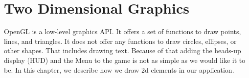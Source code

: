 \section{Two Dimensional Graphics} \label{chap:two_dimensional_graphics}
OpenGL is a low-level graphics API.
It offers a set of functions to draw points, lines, and triangles.
It does not offer any functions to draw circles, ellipses, or other shapes.
That includes drawing text. 
Because of that adding the heads-up display (HUD) and the Menu to the game is not as simple as we would like it to be.
In this chapter, we describe how we draw 2d elements in our application.



